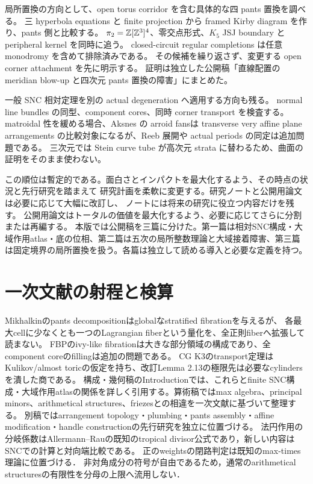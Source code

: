 \documentclass[11pt,a4paper]{article}
\begin{document}
局所置換の方向として、open torus corridor を含む具体的な四 pants 置換を調べる。
三 hyperbola equations と finite projection から framed Kirby diagram を作り、pants 側と比較する。
$\pi_2=\mathbb Z[\mathbb Z^3]^4$、零交点形式、$K_5$ JSJ boundary と peripheral kernel を同時に追う。
closed-circuit regular completions は任意 monodromy を含めて排除済みである。
その候補を繰り返さず、変更する open corner attachment を先に明示する。
証明は独立した公開稿「直線配置の meridian blow-up と四次元 pants 置換の障害」にまとめた。

一般 SNC 相対定理を別の actual degeneration へ適用する方向も残る。
normal line bundles の同型、component cores、同時 corner transport を検査する。
matroidal 性を緩める場合、Aksnes の arroid fans\cite{Aksnes}は
transverse very affine plane arrangements の比較対象になるが、Reeb 展開や actual periods の同定は追加問題である。
三次元では Stein curve tube が高次元 strata に替わるため、曲面の証明をそのまま使わない。

この順位は暫定的である。面白さとインパクトを最大化するよう、その時点の状況と先行研究を踏まえて
研究計画を柔軟に変更する。研究ノートと公開用論文は必要に応じて大幅に改訂し、
ノートには将来の研究に役立つ内容だけを残す。
公開用論文はトータルの価値を最大化するよう、必要に応じてさらに分割または再編する。
本版では公開稿を三篇に分けた。第一篇は相対SNC構成・大域作用atlas・底の位相、第二篇は五次の局所整数理論と大域接着障害、第三篇は固定境界の局所置換を扱う。各篇は独立して読める導入と必要な定義を持つ。

\section{一次文献の射程と検算}

Mikhalkinのpants decompositionはglobalなstratified fibrationを与えるが、
各最大cellに少なくとも一つのLagrangian fiberという量化を、全正則fiberへ拡張して読まない\cite{Mikhalkin}。
FBPのivy-like fibrationは大きな部分領域の構成であり、全component coreのfillingは追加の問題である\cite{FBP}。
CG K3のtransport定理はKulikov/almost toricの仮定を持ち、改訂Lemma 2.13の極限先は必要なcylindersを潰した商である\cite{CGK3}。
構成・幾何稿のIntroductionでは、これらとfinite SNC構成・大域作用atlasの関係を詳しく引用する。算術稿ではmax algebra、principal minors、arithmetical structures、friezesとの相違を一次文献に基づいて整理する。
別稿ではarrangement topology・plumbing・pants assembly・affine modification・handle constructionの先行研究を独立に位置づける。
法円作用の分岐係数はAllermann--Rauの既知のtropical divisor公式であり，新しい内容はSNCでの計算と対向端比較である\cite{AllermannRau}。
正のweightsの閉路判定は既知のmax-times理論に位置づける\cite{SergeevSchneiderButkovic}．
非対角成分の符号が自由であるため，通常のarithmetical structuresの有限性\cite{CorralesValencia}を分母の上限へ流用しない．
\end{document}
